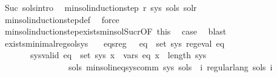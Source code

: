 \begin{isabellebody}
\ Suc\ sols{\isacharunderscore}{\kern0pt}intro\ \isamarkupfalse%
\ {\isachardoublequoteopen}min{\isacharunderscore}{\kern0pt}sol{\isacharunderscore}{\kern0pt}induction{\isacharunderscore}{\kern0pt}step\ r\ sys\ sols\ sol{\isacharunderscore}{\kern0pt}r{\isachardoublequoteclose}\isanewline
\ \ \ \ \isamarkupfalse%
\ min{\isacharunderscore}{\kern0pt}sol{\isacharunderscore}{\kern0pt}induction{\isacharunderscore}{\kern0pt}step{\isacharunderscore}{\kern0pt}def\ \isamarkupfalse%
\ force\isanewline
\ \ \isamarkupfalse%
\ min{\isacharunderscore}{\kern0pt}sol{\isacharunderscore}{\kern0pt}induction{\isacharunderscore}{\kern0pt}step{\isachardot}{\kern0pt}exists{\isacharunderscore}{\kern0pt}min{\isacharunderscore}{\kern0pt}sol{\isacharunderscore}{\kern0pt}Suc{\isacharunderscore}{\kern0pt}r{\isacharbrackleft}{\kern0pt}OF\ this{\isacharbrackright}{\kern0pt}\ \isamarkupfalse%
\ {\isacharquery}{\kern0pt}case\ \isamarkupfalse%
\ blast\isanewline
{}\isamarkupfalse%
%
\endisatagproof
{\isafoldproof}%
%
\isadelimproof
\isanewline
%
\endisadelimproof
\isanewline
{}\isamarkupfalse%
\ exists{\isacharunderscore}{\kern0pt}minimal{\isacharunderscore}{\kern0pt}reg{\isacharunderscore}{\kern0pt}sol{\isacharunderscore}{\kern0pt}sys{\isacharcolon}{\kern0pt}\isanewline
\ \ \ eqs{\isacharunderscore}{\kern0pt}reg{\isacharcolon}{\kern0pt}\ \ \ {\isachardoublequoteopen}{\isasymforall}eq\ {\isasymin}\ set\ sys{\isachardot}{\kern0pt}\ reg{\isacharunderscore}{\kern0pt}eval\ eq{\isachardoublequoteclose}\isanewline
\ \ \ \ \ \ \ sys{\isacharunderscore}{\kern0pt}valid{\isacharcolon}{\kern0pt}\ {\isachardoublequoteopen}{\isasymforall}eq\ {\isasymin}\ set\ sys{\isachardot}{\kern0pt}\ {\isasymforall}x\ {\isasymin}\ vars\ eq{\isachardot}{\kern0pt}\ x\ {\isacharless}{\kern0pt}\ length\ sys{\isachardoublequoteclose}\isanewline
\ \ \ \ \ \ \ \ \ \ \ \ \ \ \ \ {\isachardoublequoteopen}{\isasymexists}sols{\isachardot}{\kern0pt}\ min{\isacharunderscore}{\kern0pt}sol{\isacharunderscore}{\kern0pt}ineq{\isacharunderscore}{\kern0pt}sys{\isacharunderscore}{\kern0pt}comm\ sys\ sols\ {\isasymand}\ {\isacharparenleft}{\kern0pt}{\isasymforall}i{\isachardot}{\kern0pt}\ regular{\isacharunderscore}{\kern0pt}lang\ {\isacharparenleft}{\kern0pt}sols\ i{\isacharparenright}{\kern0pt}{\isacharparenright}{\kern0pt}{\isachardoublequoteclose}\isanewline
%
\isadelimproof
%
\endisadelimproof
%
\isatagproof
{}\isamarkupfalse%

\end{isabellebody}
